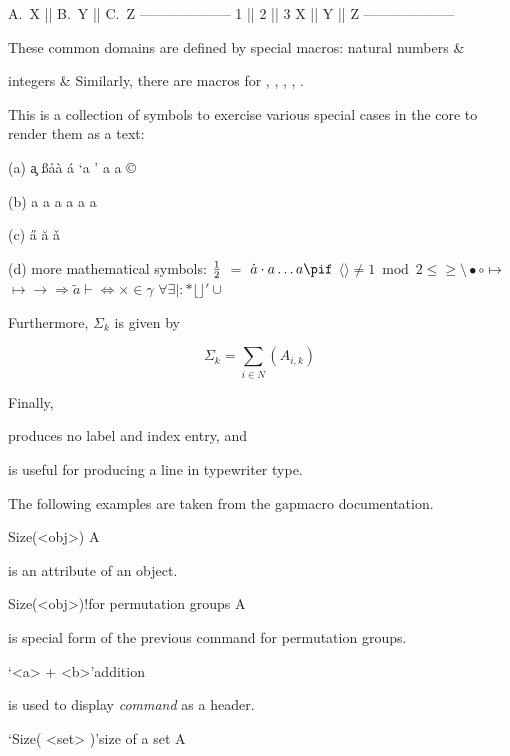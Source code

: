 \begintt
A.~X || B.~Y || C.~Z
--------------------
1    || 2    || 3
X    || Y    || Z
--------------------
\endtt

These common domains are defined by special macros:
\beginitems
natural numbers &
  \N

integers &
  \Z
\enditems
\hfill Similarly, there are macros for \Q, \R, \C, \F, \calR.

This is a collection of symbols to exercise various special
cases in the core to render them as a text:
\beginlist%
\item{(a)} \c a \ss \aa \`a \'a \lq a \rq {} a  a  \copyright
\item{(b)}  a  a  a  a  a  a
\item{(c)} \H a \u a \v a
\item{(d)} \hbox{more} mathematical symbols:
\itemitem{--} $ 1 \over 2 $ \quad $=$ \qquad $ \dot a \cdot a \dots a \pif $
\itemitem{--} $ \langle \rangle \ne 1 \bmod 2 \le \ge \setminus%
                \bullet \circ \mapsto $
\itemitem{--} $ \longmapsto \to \Rightarrow \tilde a \vdash \iff \times \in \gamma $
\itemitem{--} $ \forall \exists \mid \colon \ast \lfloor \rfloor \prime \cup $
\endlist

Furthermore, $\Sigma_{k}$ is given by

$$
\Sigma_{k} = \sum\limits_{i\in N}(A_{i,k})
$$

Finally,
%

produces no label and index entry, and 


is useful for producing a line in typewriter type.



The following examples are taken from the gapmacro documentation.

\>Size(<obj>) A

is an attribute of an object.

\>Size(<obj>)!{for permutation groups} A

is special form of the previous command for permutation groups.

\>`<a> + <b>'{addition}

is used to display {\it command} as a header.

\>`Size( <set> )'{size of a set} A


